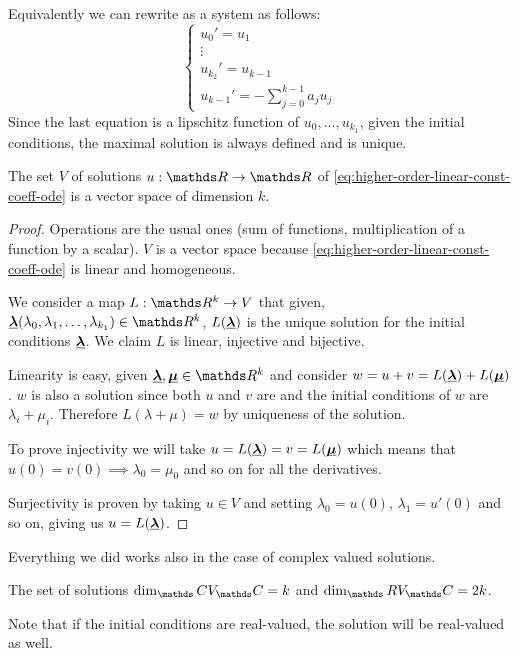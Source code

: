 \documentclass[12pt]{extarticle}
\renewcommand{\vec}[1]{\uvec{#1}}
\begin{document}
Equivalently we can rewrite as a system as follows:
\begin{equation}
	\begin{cases}
		u_0' = u_1         \\
		\vdots             \\
		u_{k_2}' = u_{k-1} \\
		u_{k-1}' = - \sum_{j = 0}^{k-1} a_j u_j
	\end{cases}
\end{equation}
Since the last equation is a lipschitz function of $u_0, \dots, u_{k_1}$, given the initial conditions, the maximal solution is always defined and is unique.

\begin{proposition}{}{}
	The set $V$ of solutions $u: \R \to \R$ of \cref{eq:higher-order-linear-const-coeff-ode} is a vector space of dimension $k$.
\end{proposition}

\begin{proof}
	Operations are the usual ones (sum of functions, multiplication of a function by a scalar).
	$V$ is a vector space because \cref{eq:higher-order-linear-const-coeff-ode} is linear and homogeneous.

	We consider a map $L: \R^k \to V$ that given, $\vec \lambda (\lambda_0, \lambda_1, \dots, \lambda_{k_1}) \in \R^k$, $L(\vec \lambda)$ is the unique solution for the initial conditions $\vec \lambda$.
	We claim $L$ is linear, injective and bijective.

	Linearity is easy, given $\vec \lambda, \vec \mu \in \R^k$ and consider $w = u + v = L(\vec \lambda) + L(\vec \mu)$.
	$w$ is also a solution since both $u$ and $v$ are and the initial conditions of $w$ are $\lambda_i + \mu_i$.
	Therefore $L(\lambda + \mu) = w$ by uniqueness of the solution.

	To prove injectivity we will take $u = L(\vec \lambda) = v = L (\vec \mu)$ which means that $u(0) = v(0) \implies \lambda_0 = \mu_0$ and so on for all the derivatives.

	Surjectivity is proven by taking $u \in V$ and setting $\lambda_0 = u(0)$, $\lambda_1 = u'(0)$ and so on, giving us $u = L(\vec \lambda)$.
\end{proof}

\begin{remark}{}{}
	Everything we did works also in the case of complex valued solutions.

	The set of solutions $\dim_\C V_\C = k$ and $\dim_\R V_\C = 2k$.

	Note that if the initial conditions are real-valued, the solution will be real-valued as well.
\end{remark}
\end{document}
